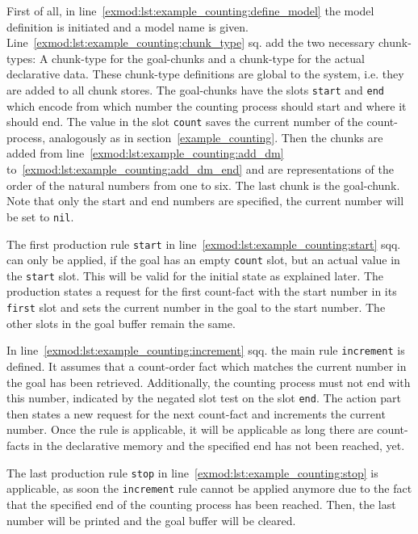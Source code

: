 First of all, in line~\ref{exmod:lst:example_counting:define_model} the model definition is initiated and a model name is given. Line~\ref{exmod:lst:example_counting:chunk_type} sq. add the two necessary chunk-types: A chunk-type for the goal-chunks and a chunk-type for the actual declarative data. These chunk-type definitions are global to the system, i.e. they are added to all chunk stores. The goal-chunks have the slots \lstinline|start| and \lstinline|end| which encode from which number the counting process should start and where it should end. The value in the slot \lstinline|count| saves the current number of the count-process, analogously as in section~\ref{example_counting}. Then the chunks are added from line~\ref{exmod:lst:example_counting:add_dm} to~\ref{exmod:lst:example_counting:add_dm_end} and are representations of the order of the natural numbers from one to six. The last chunk is the goal-chunk. Note that only the start and end numbers are specified, the current number will be set to \lstinline|nil|.

The first production rule \lstinline|start| in line~\ref{exmod:lst:example_counting:start} sqq. can only be applied, if the goal has an empty \lstinline|count| slot, but an actual value in the \lstinline|start| slot. This will be valid for the initial state as explained later. The production states a request for the first count-fact with the start number in its \lstinline|first| slot and sets the current number in the goal to the start number. The other slots in the goal buffer remain the same.

In line~\ref{exmod:lst:example_counting:increment} sqq. the main rule \lstinline|increment| is defined. It assumes that a count-order fact which matches the current number in the goal has been retrieved. Additionally, the counting process must not end with this number, indicated by the negated slot test on the slot \lstinline|end|. The action part then states a new request for the next count-fact and increments the current number. Once the rule is applicable, it will be applicable as long there are count-facts in the declarative memory and the specified end has not been reached, yet.

The last production rule \lstinline|stop| in line~\ref{exmod:lst:example_counting:stop} is applicable, as soon the \lstinline|increment| rule cannot be applied anymore due to the fact that the specified end of the counting process has been reached. Then, the last number will be printed and the goal buffer will be cleared.

